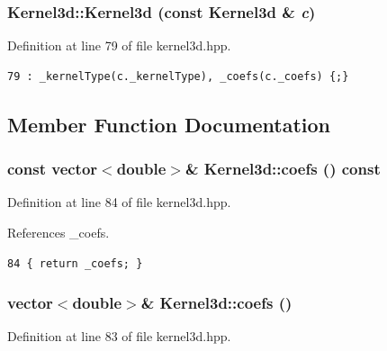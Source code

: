 \subsubsection{\setlength{\rightskip}{0pt plus 5cm}Kernel3d::Kernel3d (const {\bf Kernel3d} \& {\em c})\hspace{0.3cm}{\tt  [inline]}}\label{classKernel3d_60f915df4cd889acf6f3817c530879b0_60f915df4cd889acf6f3817c530879b0}




Definition at line 79 of file kernel3d.hpp.

\footnotesize\begin{verbatim}79 : _kernelType(c._kernelType), _coefs(c._coefs) {;}
\end{verbatim}\normalsize 




\subsection{Member Function Documentation}
\subsubsection{\setlength{\rightskip}{0pt plus 5cm}const vector$<$double$>$\& Kernel3d::coefs () const\hspace{0.3cm}{\tt  [inline]}}\label{classKernel3d_869ed9e1e4e4eba94ef7ffba3a3d82a9_869ed9e1e4e4eba94ef7ffba3a3d82a9}




Definition at line 84 of file kernel3d.hpp.

References \_\-coefs.

\footnotesize\begin{verbatim}84 { return _coefs; }
\end{verbatim}\normalsize 


\subsubsection{\setlength{\rightskip}{0pt plus 5cm}vector$<$double$>$\& Kernel3d::coefs ()\hspace{0.3cm}{\tt  [inline]}}\label{classKernel3d_6cee00fd70607c0a0f51594392b6594b_6cee00fd70607c0a0f51594392b6594b}




Definition at line 83 of file kernel3d.hpp.

